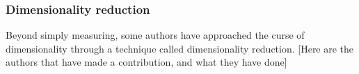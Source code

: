 \subsubsection{Dimensionality reduction}
Beyond simply measuring, some authors have approached the curse of dimensionality through a technique called dimensionality reduction. [Here are the authors that have made a contribution, and what they have done] 

